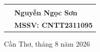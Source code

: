 \begin{titlepage}
\begin{center}
\begin{center}
\begin{tabular}{p{7.5cm}l}
            \vspace{0.2cm} & \\ %
            
            & \fontsize{14}{16}\selectfont \textbf{Nguyễn Ngọc Sơn} \\
            & \fontsize{14}{16}\selectfont \textbf{MSSV: CNTT2311095} \\
        \end{tabular}
    \end{center}

    \vfill
    {\fontsize{13}{15}\selectfont Cần Thơ, tháng 8 năm 2026 \par}
\end{center}
\end{titlepage}